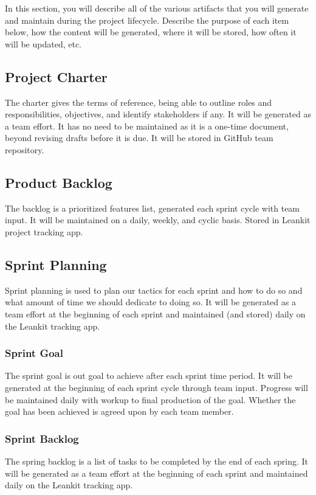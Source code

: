 In this section, you will describe all of the various artifacts that you will generate and maintain during the project lifecycle. Describe the purpose of each item below, how the content will be generated, where it will be stored, how often it will be updated, etc. 

\subsection{Project Charter}
The charter gives the terms of reference, being able to outline roles and responsibilities, objectives, and identify stakeholders if any. It will be generated as a team effort. It has no need to be maintained as it is a one-time document, beyond revising drafts before it is due. It will be stored in GitHub team repository.

\subsection{Product Backlog}
The backlog is a prioritized features list, generated each sprint cycle with team input. It will be maintained on a daily, weekly, and cyclic basis. Stored in Leankit project tracking app.

\subsection{Sprint Planning}
Sprint planning is used to plan our tactics for each sprint and how to do so and what amount of time we should dedicate to doing so. It will be generated as a team effort at the beginning of each sprint and maintained (and stored) daily on the Leankit tracking app.

\subsubsection{Sprint Goal}
The sprint goal is out goal to achieve after each sprint time period. It will be generated at the beginning of each sprint cycle through team input. Progress will be maintained daily with workup to final production of the goal. Whether the goal has been achieved is agreed upon by each team member.

\subsubsection{Sprint Backlog}
The spring backlog is a list of tasks to be completed by the end of each spring. It will be generated as a team effort at the beginning of each sprint and maintained daily on the Leankit tracking app.

